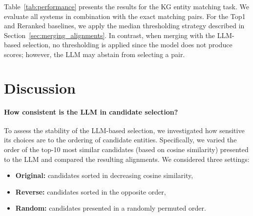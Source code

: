 \documentclass[11pt]{article}
\begin{document}
Table~\ref{tab:performance} presents the results for the KG entity matching task. 
We evaluate all systems in combination with the exact matching pairs. For the Top1 and Reranked baselines, we apply the median thresholding strategy described in Section~\ref{sec:merging_alignments}. 
In contrast, when merging with the LLM-based selection, no thresholding is applied since the model does not produce scores; however, the LLM may abstain from selecting a pair.



\section{Discussion}

\paragraph{How consistent is the LLM in candidate selection?}
To assess the stability of the LLM-based selection, we investigated how sensitive its choices are to the ordering of candidate entities. Specifically, we varied the order of the top-10 most similar candidates (based on cosine similarity) presented to the LLM and compared the resulting alignments. We considered three settings:
\begin{itemize}[nosep]
\setlength\itemsep{0em}
\setlength\parskip{0em}
\setlength\parsep{0em}
\item \textbf{Original:} candidates sorted in decreasing cosine similarity,
\item \textbf{Reverse:} candidates sorted in the opposite order,
\item \textbf{Random:} candidates presented in a randomly permuted order.
\end{itemize}
\end{document}
